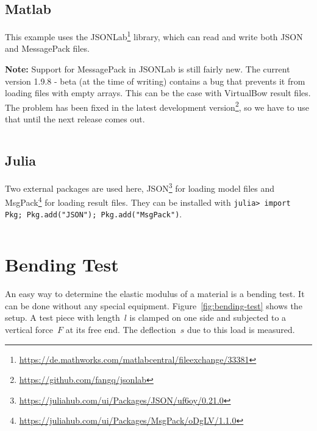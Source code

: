 \documentclass[12pt]{article}
\begin{document}
\bigskip

\begin{framed}
\inputminted{python}{../examples/scripts/python/example.py}
\end{framed}

\newpage
\subsection{Matlab}

This example uses the JSONLab\footnote{\url{https://de.mathworks.com/matlabcentral/fileexchange/33381}} library, which can read and write both JSON and MessagePack files.

\textbf{Note:} Support for MessagePack in JSONLab is still fairly new. The current version 1.9.8 - beta (at the time of writing) contains a bug that prevents it from loading files with empty arrays.
This can be the case with VirtualBow result files.
The problem has been fixed in the latest development version\footnote{\url{https://github.com/fangq/jsonlab}}, so we have to use that until the next release comes out.

\bigskip

\begin{framed}
\inputminted{matlab}{../examples/scripts/matlab/example.m}
\end{framed}

\newpage
\subsection{Julia}

Two external packages are used here, JSON\footnote{\url{https://juliahub.com/ui/Packages/JSON/uf6oy/0.21.0}} for loading model files and MsgPack\footnote{\url{https://juliahub.com/ui/Packages/MsgPack/oDgLV/1.1.0}} for loading result files. They can be installed with \texttt{julia> import Pkg; Pkg.add("JSON"); Pkg.add("MsgPack")}.

\bigskip

\begin{framed}
\inputminted{python}{../examples/scripts/julia/example.jl}
\end{framed}

\newpage
\section{Bending Test}
\label{sec:bending-test}

An easy way to determine the elastic modulus of a material is a bending test.
It can be done without any special equipment.
Figure~\ref{fig:bending-test} shows the setup.
A test piece with length~$l$ is clamped on one side and subjected to a vertical force~$F$ at its free end.
The deflection~$s$ due to this load is measured.
\end{document}
